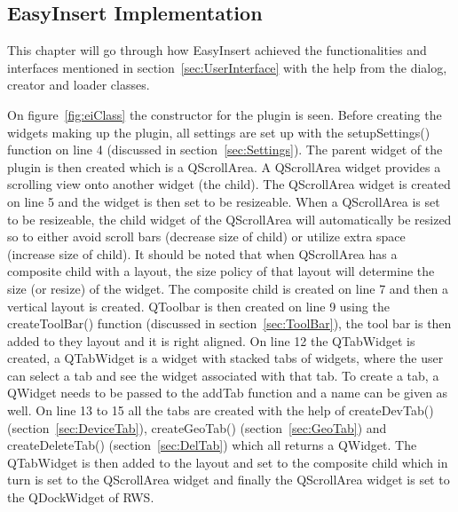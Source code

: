 \subsection{EasyInsert Implementation}
This chapter will go through how EasyInsert achieved the functionalities and interfaces mentioned in section~\ref{sec:UserInterface} with the help from the dialog, creator and loader classes. 

On figure~\ref{fig:eiClass} the constructor for the plugin is seen. Before creating the widgets making up the plugin, all settings are set up with the setupSettings() function on line 4 (discussed in section~\ref{sec:Settings}). The parent widget of the plugin is then created which is a QScrollArea. A QScrollArea widget provides a scrolling view onto another widget (the child). The QScrollArea widget is created on line 5 and the widget is then set to be resizeable. When a QScrollArea is set to be resizeable, the child widget of the QScrollArea will automatically be resized so to either avoid scroll bars (decrease size of child) or utilize extra space (increase size of child). It should be noted that when QScrollArea has a composite child with a layout, the size policy of that layout will determine the size (or resize) of the widget. The composite child is created on line 7 and then a vertical layout is created. QToolbar is then created on line 9 using the createToolBar() function (discussed in section~\ref{sec:ToolBar}), the tool bar is then added to they layout and it is right aligned. On line 12 the QTabWidget is created, a QTabWidget is a widget with stacked tabs of widgets, where the user can select a tab and see the widget associated with that tab. To create a tab, a QWidget needs to be passed to the addTab function and a name can be given as well. On line 13 to 15 all the tabs are created with the help of createDevTab() (section~\ref{sec:DeviceTab}), createGeoTab() (section~\ref{sec:GeoTab}) and createDeleteTab() (section~\ref{sec:DelTab}) which all returns a QWidget. The QTabWidget is then added to the layout and set to the composite child which in turn is set to the QScrollArea widget and finally the QScrollArea widget is set to the QDockWidget of RWS. 

